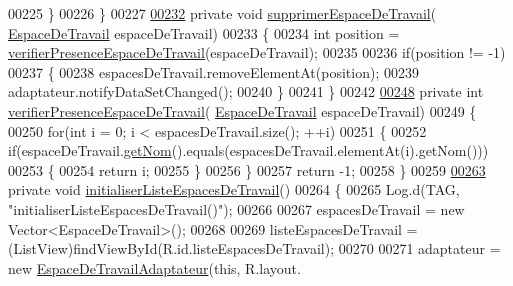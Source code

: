 \begin{DoxyCode}
00225         \}
00226     \}
00227 
\hyperlink{classcom_1_1lasalle_1_1meeting_1_1_i_h_m_meeting_a1418ee16ded8b09f4c4a9c1a9359163a}{00232}     \textcolor{keyword}{private} \textcolor{keywordtype}{void} \hyperlink{classcom_1_1lasalle_1_1meeting_1_1_i_h_m_meeting_a1418ee16ded8b09f4c4a9c1a9359163a}{supprimerEspaceDeTravail}(
      \hyperlink{classcom_1_1lasalle_1_1meeting_1_1_espace_de_travail}{EspaceDeTravail} espaceDeTravail)
00233     \{
00234         \textcolor{keywordtype}{int} position = \hyperlink{classcom_1_1lasalle_1_1meeting_1_1_i_h_m_meeting_a402dc23f375fae1f1faa3d5728cdad00}{verifierPresenceEspaceDeTravail}(espaceDeTravail);
00235 
00236         \textcolor{keywordflow}{if}(position != -1)
00237         \{
00238             espacesDeTravail.removeElementAt(position);
00239             adaptateur.notifyDataSetChanged();
00240         \}
00241     \}
00242 
\hyperlink{classcom_1_1lasalle_1_1meeting_1_1_i_h_m_meeting_a402dc23f375fae1f1faa3d5728cdad00}{00248}     \textcolor{keyword}{private} \textcolor{keywordtype}{int} \hyperlink{classcom_1_1lasalle_1_1meeting_1_1_i_h_m_meeting_a402dc23f375fae1f1faa3d5728cdad00}{verifierPresenceEspaceDeTravail}(
      \hyperlink{classcom_1_1lasalle_1_1meeting_1_1_espace_de_travail}{EspaceDeTravail} espaceDeTravail)
00249     \{
00250         \textcolor{keywordflow}{for}(\textcolor{keywordtype}{int} i = 0; i < espacesDeTravail.size(); ++i)
00251         \{
00252             \textcolor{keywordflow}{if}(espaceDeTravail.\hyperlink{classcom_1_1lasalle_1_1meeting_1_1_espace_de_travail_ae662e2674616a8548755cb64a38e0432}{getNom}().equals(espacesDeTravail.elementAt(i).getNom()))
00253             \{
00254                 \textcolor{keywordflow}{return} i;
00255             \}
00256         \}
00257         \textcolor{keywordflow}{return} -1;
00258     \}
00259 
\hyperlink{classcom_1_1lasalle_1_1meeting_1_1_i_h_m_meeting_a6624feade3dc156bc7eb40f79cb47267}{00263}     \textcolor{keyword}{private} \textcolor{keywordtype}{void} \hyperlink{classcom_1_1lasalle_1_1meeting_1_1_i_h_m_meeting_a6624feade3dc156bc7eb40f79cb47267}{initialiserListeEspacesDeTravail}()
00264     \{
00265         Log.d(TAG, \textcolor{stringliteral}{"initialiserListeEspacesDeTravail()"});
00266 
00267         espacesDeTravail = \textcolor{keyword}{new} Vector<EspaceDeTravail>();
00268 
00269         listeEspacesDeTravail = (ListView)findViewById(R.id.listeEspacesDeTravail);
00270 
00271         adaptateur = \textcolor{keyword}{new} \hyperlink{classcom_1_1lasalle_1_1meeting_1_1_espace_de_travail_adaptateur}{EspaceDeTravailAdaptateur}(\textcolor{keyword}{this}, R.layout.

\end{DoxyCode}
